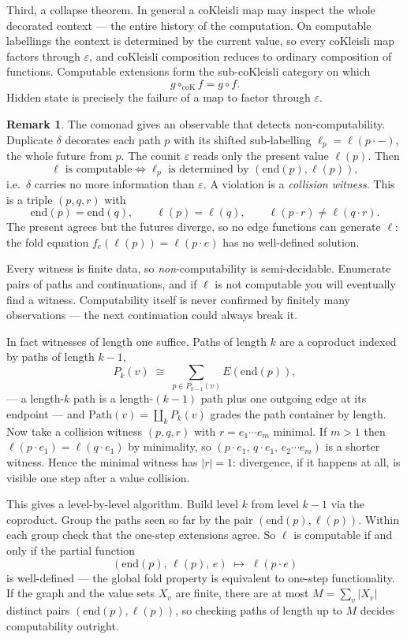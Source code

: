 \documentclass[11pt, a4paper]{article}
\theoremstyle{definition}
\newtheorem{remark}[definition]{Remark}
\theoremstyle{plain}
\begin{document}
Third, a collapse theorem.  In general a coKleisli map may inspect
the whole decorated context --- the entire history of the
computation.  On computable labellings the context is determined by
the current value, so every coKleisli map factors through
$\varepsilon$, and coKleisli composition reduces to ordinary
composition of functions.  Computable extensions form the
sub-coKleisli category on which
\[
  g \circ_{\mathrm{coK}} f = g \circ f.
\]
Hidden state is precisely the failure of a map to factor through
$\varepsilon$.

\begin{remark}
\label{rem:collision-witness}
The comonad gives an observable that detects non-computability.
Duplicate $\delta$ decorates each path $p$ with its shifted
sub-labelling $\ell_p = \ell(p \cdot -)$, the whole future from $p$.
The counit $\varepsilon$ reads only the present value $\ell(p)$.
Then
\[
  \ell \text{ is computable}
  \iff
  \ell_p \text{ is determined by } (\mathrm{end}(p), \ell(p)),
\]
i.e.\ $\delta$ carries no more information than $\varepsilon$.  A
violation is a \emph{collision witness}.  This is a triple $(p, q, r)$ with
\[
  \mathrm{end}(p) = \mathrm{end}(q),
  \qquad
  \ell(p) = \ell(q),
  \qquad
  \ell(p \cdot r) \neq \ell(q \cdot r).
\]
The present agrees but the futures diverge, so no edge functions can
generate $\ell$: the fold equation $f_e(\ell(p)) = \ell(p \cdot e)$
has no well-defined solution.

Every witness is finite data, so \emph{non}-computability is
semi-decidable.  Enumerate pairs of paths and continuations, and if
$\ell$ is not computable you will eventually find a witness.
Computability itself is never confirmed by finitely many
observations --- the next continuation could always break it.

In fact witnesses of length one suffice.  Paths of length $k$ are a
coproduct indexed by paths of length $k-1$,
\[
  P_k(v) \;\cong\; \sum_{p \in P_{k-1}(v)} E(\mathrm{end}(p)),
\]
--- a length-$k$ path is a length-$(k-1)$ path plus one outgoing edge
at its endpoint --- and $\mathrm{Path}(v) = \coprod_k P_k(v)$ grades
the path container by length.  Now take a collision witness
$(p, q, r)$ with $r = e_1 \cdots e_m$ minimal.  If $m > 1$ then
$\ell(p \cdot e_1) = \ell(q \cdot e_1)$ by minimality, so
$(p \cdot e_1,\, q \cdot e_1,\, e_2 \cdots e_m)$ is a shorter
witness.  Hence the minimal witness has $|r| = 1$: divergence, if it
happens at all, is visible one step after a value collision.

This gives a level-by-level algorithm.  Build level $k$ from level
$k-1$ via the coproduct.  Group the paths seen so far by the pair
$(\mathrm{end}(p), \ell(p))$.  Within each group check that the
one-step extensions agree.  So $\ell$ is computable if and only if
the partial function
\[
  (\mathrm{end}(p),\, \ell(p),\, e) \;\longmapsto\; \ell(p \cdot e)
\]
is well-defined --- the global fold property is equivalent to
one-step functionality.  If the graph and the value sets $X_v$ are
finite, there are at most $M = \sum_v |X_v|$ distinct pairs
$(\mathrm{end}(p), \ell(p))$, so checking paths of length up to $M$
decides computability outright.
\end{remark}
\end{document}
